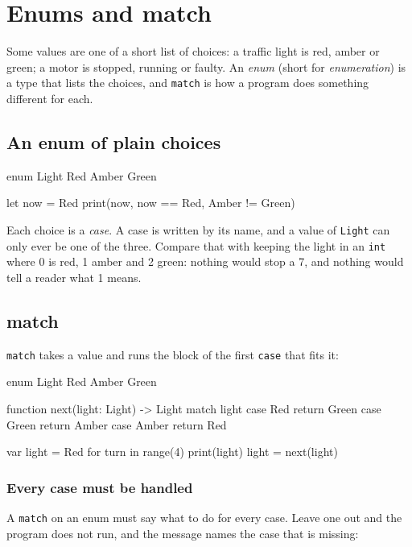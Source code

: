 \chapter{Enums and match}\label{ch-enums}

Some values are one of a short list of choices: a traffic light is red,
amber or green; a motor is stopped, running or faulty. An \emph{enum}
(short for \emph{enumeration}) is a type that lists the choices, and
\verb|match| is how a program does something different for each.

\section{An enum of plain choices}

\begin{zeno}
enum Light {
    Red
    Amber
    Green
}

let now = Red
print(now, now == Red, Amber != Green)
\end{zeno}

Each choice is a \emph{case}. A case is written by its name, and a
value of \verb|Light| can only ever be one of the three. Compare that
with keeping the light in an \verb|int| where 0 is red, 1 amber and 2
green: nothing would stop a 7, and nothing would tell a reader what 1
means.

\section{match}

\verb|match| takes a value and runs the block of the first
\verb|case| that fits it:

\begin{zeno}
enum Light {
    Red
    Amber
    Green
}

function next(light: Light) -> Light {
    match light {
        case Red { return Green }
        case Green { return Amber }
        case Amber { return Red }
    }
}

var light = Red
for turn in range(4) {
    print(light)
    light = next(light)
}
\end{zeno}

\subsection{Every case must be handled}

A \verb|match| on an enum must say what to do for every case. Leave one
out and the program does not run, and the message names the case that
is missing:

